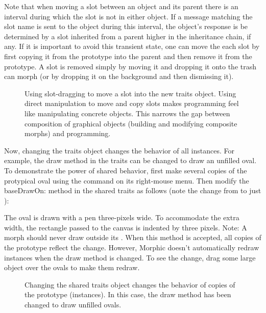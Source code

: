 \documentclass[letterpaper,10pt,english]{sphinxmanual}
\begin{document}
Note that when moving a slot between an object and its parent there is an interval during which the slot is not in either object. If a message matching the slot name is sent to the object during this interval, the object's response is be determined by a slot inherited from a parent higher in the inheritance chain, if any. If it is important to avoid this transient state, one can move the each slot by first copying it from the prototype into the parent and then remove it from the prototype. A slot is removed simply by moving it and dropping it onto the trash can morph (or by dropping it on the background and then dismissing it).
\begin{figure}[htbp]
\centering
\capstart

\noindent{}
\caption{Using slot-dragging to move a slot into the new traits object. Using direct manipulation to move and copy slots makes programming feel like manipulating concrete objects. This narrows the gap between composition of graphical objects (building and modifying composite morphs) and programming.}\label{\detokenize{morphic:id8}}\end{figure}

Now, changing the traits object changes the behavior of all instances. For example, the draw method in the traits can be changed to draw an unfilled oval. To demonstrate the power of shared behavior, first make several copies of the protypical oval using the  command on its right-mouse menu. Then modify the baseDrawOn: method in the shared traits as follows (note the change from  to just ):

\begin{sphinxVerbatim}[commandchars=\\\{\}]
   
        
         
         
         
         
\end{sphinxVerbatim}

The oval is drawn with a pen three-pixels wide. To accommodate the extra width, the rectangle passed to the canvas is indented by three pixels. Note: A morph should never draw outside its . When this method is accepted, all copies of the prototype reflect the change. However, Morphic doesn't automatically redraw instances when the draw method is changed. To see the change, drag some large object over the ovals to make them redraw.
\begin{figure}[htbp]
\centering
\capstart

\noindent{}
\caption{Changing the shared traits object changes the behavior of copies of the prototype (instances). In this case, the draw method has been changed to draw unfilled ovals.}\label{\detokenize{morphic:id9}}\end{figure}
\end{document}
